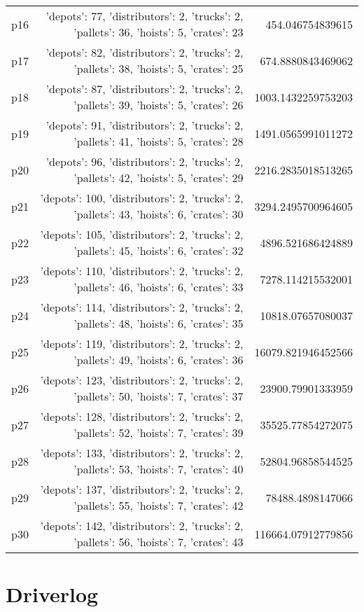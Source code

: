 \documentclass{article}
\begin{document}
\begin{center}
\begin{tabular}{r|r|r}
  p16&{'depots': 77, 'distributors': 2, 'trucks': 2, 'pallets': 36, 'hoists': 5, 'crates': 23}&454.046754839615\\
  p17&{'depots': 82, 'distributors': 2, 'trucks': 2, 'pallets': 38, 'hoists': 5, 'crates': 25}&674.8880843469062\\
  p18&{'depots': 87, 'distributors': 2, 'trucks': 2, 'pallets': 39, 'hoists': 5, 'crates': 26}&1003.1432259753203\\
  p19&{'depots': 91, 'distributors': 2, 'trucks': 2, 'pallets': 41, 'hoists': 5, 'crates': 28}&1491.0565991011272\\
  p20&{'depots': 96, 'distributors': 2, 'trucks': 2, 'pallets': 42, 'hoists': 5, 'crates': 29}&2216.2835018513265\\
  p21&{'depots': 100, 'distributors': 2, 'trucks': 2, 'pallets': 43, 'hoists': 6, 'crates': 30}&3294.2495700964605\\
  p22&{'depots': 105, 'distributors': 2, 'trucks': 2, 'pallets': 45, 'hoists': 6, 'crates': 32}&4896.521686424889\\
  p23&{'depots': 110, 'distributors': 2, 'trucks': 2, 'pallets': 46, 'hoists': 6, 'crates': 33}&7278.114215532001\\
  p24&{'depots': 114, 'distributors': 2, 'trucks': 2, 'pallets': 48, 'hoists': 6, 'crates': 35}&10818.07657080037\\
  p25&{'depots': 119, 'distributors': 2, 'trucks': 2, 'pallets': 49, 'hoists': 6, 'crates': 36}&16079.821946452566\\
  p26&{'depots': 123, 'distributors': 2, 'trucks': 2, 'pallets': 50, 'hoists': 7, 'crates': 37}&23900.79901333959\\
  p27&{'depots': 128, 'distributors': 2, 'trucks': 2, 'pallets': 52, 'hoists': 7, 'crates': 39}&35525.77854272075\\
  p28&{'depots': 133, 'distributors': 2, 'trucks': 2, 'pallets': 53, 'hoists': 7, 'crates': 40}&52804.96858544525\\
  p29&{'depots': 137, 'distributors': 2, 'trucks': 2, 'pallets': 55, 'hoists': 7, 'crates': 42}&78488.4898147066\\
  p30&{'depots': 142, 'distributors': 2, 'trucks': 2, 'pallets': 56, 'hoists': 7, 'crates': 43}&116664.07912779856
                            \end{tabular}
                            \end{center}
                    
                            \newpage \section{Driverlog}
\end{document}
